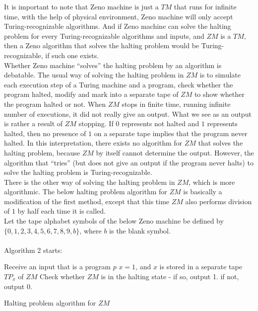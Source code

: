 \documentclass{roffin}
\begin{document}
It is important to note that Zeno machine is just a $TM$ that runs for infinite time, with the help of physical environment, Zeno machine will only accept Turing-recognizable algorithms. And if Zeno machine can solve the halting problem for every Turing-recognizable algorithms and inputs, and $ZM$ is a $TM$, then a Zeno algorithm that solves the halting problem would be Turing-recognizable, if such one exists.\\
Whether Zeno machine ``solves'' the halting problem by an algorithm is debatable. The usual way of solving the halting problem in $ZM$ is to simulate each execution step of a Turing machine and a program, check whether the program halted, modify and mark into a separate tape of $ZM$ to show whether the program halted or not. When $ZM$ stops in finite time, running infinite number of executions, it did not really give an output. What we see as an output is rather a result of $ZM$ stopping. If $0$ represents not halted and $1$ represents halted, then no presence of $1$ on a separate tape implies that the program never halted. In this interpretation, there exists no algorithm for $ZM$ that solves the halting problem, because $ZM$ by itself cannot determine the output. However, the algorithm that ``tries'' (but does not give an output if the program never halts) to solve the halting problem is Turing-recognizable.\\
There is the other way of solving the halting problem in $ZM$, which is more algorithmic. The below halting problem algorithm for $ZM$ is basically a modification of the first method, except that this time $ZM$ also performs division of $1$ by half each time it is called.\\
Let the tape alphabet symbols of the below Zeno machine be defined by $\{0,1,2,3,4,5,6,7,8,9, b\}$, where $b$ is the blank symbol.\\\\
Algorithm 2 starts:\\
\begin{algorithm}[H]
Receive an input that is a program $p$\;
$x=1$, and $x$ is stored in a separate tape $TP_x$ of $ZM$\;
Check whether $ZM$ is in the halting state - if so, output 1. if not, output 0.\;
\caption{Halting problem algorithm for $ZM$}
\end{algorithm}
\end{document}
